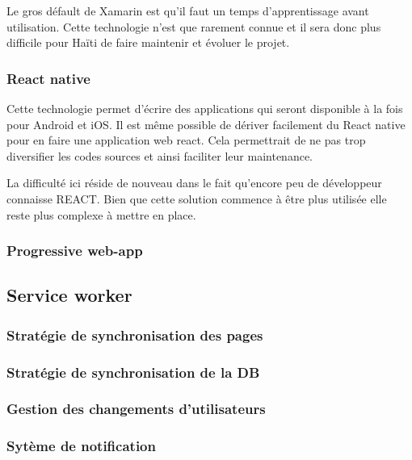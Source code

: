 \documentclass{EPL-master-thesis-covers-FR}
\begin{document}
				Le gros défault de Xamarin est qu'il faut un temps d'apprentissage avant utilisation. Cette technologie n'est que rarement connue et il sera donc plus difficile pour Haïti de faire maintenir et évoluer le projet.
				
			\subsubsection*{React native}
				Cette technologie permet d'écrire des applications qui seront disponible à la fois pour Android et iOS. Il est même possible de dériver facilement du React native pour en faire une application web react. Cela permettrait de ne pas trop diversifier les codes sources et ainsi faciliter leur maintenance.
				
				La difficulté ici réside de nouveau dans le fait qu'encore peu de développeur connaisse REACT. Bien que cette solution commence à être plus utilisée elle reste plus complexe  à mettre en place.
				
			\subsubsection*{Progressive web-app}
			
			\subsection{Service worker}
				
			\subsubsection*{Stratégie de synchronisation des pages}			
			
			\subsubsection*{Stratégie de synchronisation de la DB}
			
			
			\subsubsection*{Gestion des changements d'utilisateurs}		
			
			
			\subsubsection*{Sytème de notification}	
						
\end{document}
